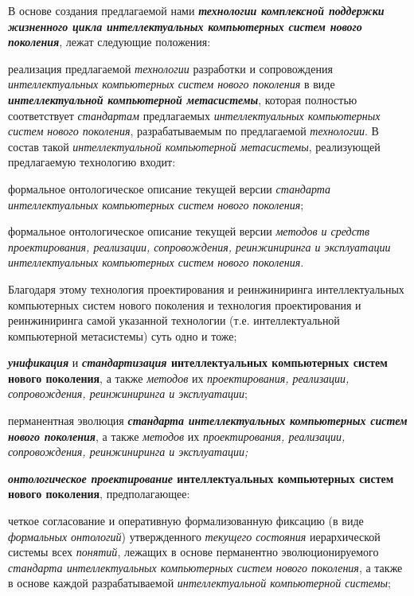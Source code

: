В основе создания предлагаемой нами \textbf{\textit{технологии комплексной поддержки жизненного цикла интеллектуальных компьютерных систем нового поколения}}, лежат следующие положения:
\begin{textitemize}
	\item реализация предлагаемой \textit{технологии} разработки и сопровождения \textit{интеллектуальных компьютерных систем нового поколения} в виде \textbf{\textit{интеллектуальной компьютерной метасистемы}}, которая полностью соответствует \textit{стандартам} предлагаемых \textit{интеллектуальных компьютерных систем нового поколения}, разрабатываемым по предлагаемой \textit{технологии}. В состав такой \textit{интеллектуальной компьютерной метасистемы}, реализующей предлагаемую технологию входит:
	
	\begin{textitemize}
		\item  формальное онтологическое описание текущей версии \textit{стандарта интеллектуальных компьютерных систем нового поколения};
		\item  формальное онтологическое описание текущей версии \textit{методов и средств проектирования, реализации, сопровождения, реинжиниринга и эксплуатации интеллектуальных компьютерных систем нового поколения}.
	\end{textitemize}
	
	Благодаря этому технология проектирования и реинжиниринга интеллектуальных компьютерных систем нового поколения и технология проектирования и реинжиниринга самой указанной технологии (т.е. интеллектуальной компьютерной метасистемы) суть одно и тоже;
	
	\item \textbf{\textit{унификация}} и \textbf{\textit{стандартизация} интеллектуальных компьютерных систем нового поколения}, а также \textit{методов} их \textit{проектирования, реализации, сопровождения, реинжиниринга и эксплуатации};
	\item перманентная эволюция \textbf{\textit{стандарта интеллектуальных компьютерных систем нового поколения}}, а также \textit{методов} их \textit{проектирования, реализации, сопровождения, реинжиниринга и эксплуатации;}
	\item \textbf{\textit{онтологическое проектирование} интеллектуальных компьютерных систем нового поколения}, предполагающее:
	
	\begin{textitemize}
		\item  четкое согласование и оперативную формализованную фиксацию (в виде \textit{формальных онтологий}) утвержденного \textit{текущего состояния} иерархической системы всех \textit{понятий}, лежащих в основе перманентно эволюционируемого \textit{стандарта интеллектуальных компьютерных систем нового поколения}, а также в основе каждой разрабатываемой \textit{интеллектуальной компьютерной системы};
		

\end{textitemize}
\end{textitemize}
